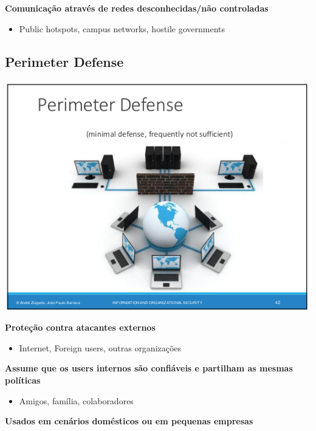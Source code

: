 \documentclass{article}
\begin{document}
\begin{flushleft}
\begin{flushleft}
    \pagebreak

    \textbf{Comunicação através de redes desconhecidas/não controladas}
    \begin{itemize}
      \item Public hotspots, campus networks, hostile governments
    \end{itemize}
  \end{flushleft}

  \subsection{Perimeter Defense}

  \begin{center}
    \includegraphics[scale=0.4]{9}
  \end{center}

  \begin{flushleft}
    \textbf{Proteção contra atacantes externos}
    \begin{itemize}
      \item Internet, Foreign users, outras organizações
    \end{itemize}

    \textbf{Assume que os users internos são confiáveis e partilham
    as mesmas políticas}
    \begin{itemize}
      \item Amigos, família, colaboradores
    \end{itemize}

    \textbf{Usados em cenários domésticos ou em pequenas empresas}


\end{flushleft}
\end{flushleft}
\end{document}
